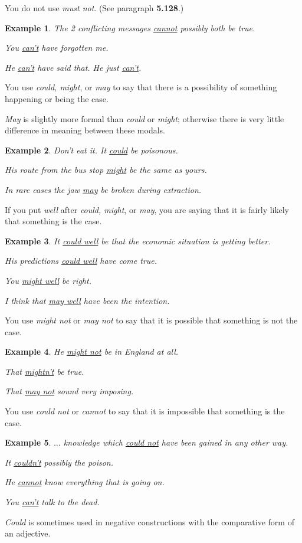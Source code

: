 \documentclass[oneside]{book}
\numberwithin{equation}{section}
\newtheorem{example}{Example}[section]
\begin{document}
You do not use \textit{must not}. (See paragraph \textbf{5.128}.)
\begin{example}
    The 2 conflicting messages \underline{cannot} possibly both be true.
    
    You \underline{can't} have forgotten me.
    
    He \underline{can't} have said that. He just \underline{can't}.
\end{example}
%
\noindent{} You use \textit{could, might}, or \textit{may} to say that there is a possibility of something happening or being the case.

\textit{May} is slightly more formal than \textit{could} or \textit{might}; otherwise there is very little difference in meaning between these modals.
\begin{example}
    Don't eat it. It \underline{could} be poisonous.
    
    His route from the bus stop \underline{might} be the same as yours.
    
    In rare cases the jaw \underline{may} be broken during extraction.
\end{example}
If you put \textit{well} after \textit{could, might}, or \textit{may}, you are saying that it is fairly likely that something is the case.
\begin{example}
    It \underline{could well} be that the economic situation is getting better.
    
    His predictions \underline{could well} have come true.
    
    You \underline{might well} be right.
    
    I think that \underline{may well} have been the intention.
\end{example}
%
\noindent{} You use \textit{might not} or \textit{may not} to say that it is possible that something is not the case.
\begin{example}
    He \underline{might not} be in England at all.
    
    That \underline{mightn't} be true.
    
    That \underline{may not} sound very imposing.
\end{example}
%
\noindent{} You use \textit{could not} or \textit{cannot} to say that it is impossible that something is the case.
\begin{example}
    $\ldots$ knowledge which \underline{could not} have been gained in any other way.
    
    It \underline{couldn't} possibly the poison.
    
    He \underline{cannot} know everything that is going on.
    
    You \underline{can't} talk to the dead.
\end{example}
%
\noindent{} \textit{Could} is sometimes used in negative constructions with the comparative form of an adjective.
\end{document}
